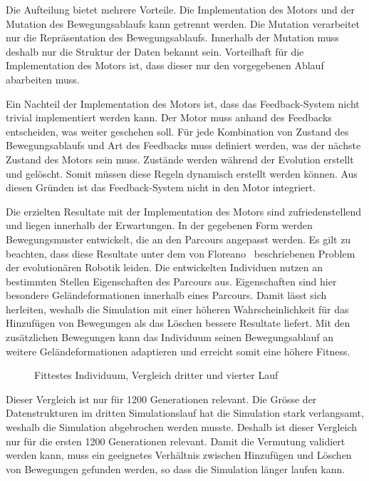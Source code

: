       \smallskip

      Die Aufteilung bietet mehrere Vorteile.
      Die Implementation des Motors und der Mutation des Bewegungsablaufs kann getrennt werden.
      Die Mutation verarbeitet nur die Repräsentation des Bewegungsablaufs.
      Innerhalb der Mutation muss deshalb nur die Struktur der Daten bekannt sein.
      Vorteilhaft für die Implementation des Motors ist, dass dieser nur den vorgegebenen Ablauf abarbeiten muss.

      \smallskip

      Ein Nachteil der Implementation des Motors ist, dass das Feedback-System nicht trivial implementiert werden kann.
      Der Motor muss anhand des Feedbacks entscheiden, was weiter geschehen soll.
      Für jede Kombination von Zustand des Bewegungsablaufs und Art des Feedbacks muss definiert werden,
      was der nächste Zustand des Motors sein muss.
      Zustände werden während der Evolution erstellt und gelöscht.
      Somit müssen diese Regeln dynamisch erstellt werden können.
      Aus diesen Gründen ist das Feedback-System nicht in den Motor integriert.

      \smallskip

      Die erzielten Resultate mit der Implementation des Motors sind zufriedenstellend und
      liegen innerhalb der Erwartungen.
      In der gegebenen Form werden Bewegungsmuster entwickelt, die an den Parcours angepasst werden.
      Es gilt zu beachten, dass diese Resultate unter dem von Floreano~\cite{Floreano2010} beschriebenen Problem
      der evolutionären Robotik leiden.
      Die entwickelten Individuen nutzen an bestimmten Stellen Eigenschaften des Parcours aus.
      Eigenschaften sind hier besondere Geländeformationen innerhalb eines Parcours.
      Damit lässt sich herleiten, weshalb die Simulation mit einer höheren Wahrscheinlichkeit
      für das Hinzufügen von Bewegungen als das Löschen bessere Resultate liefert.
      Mit den zusätzlichen Bewegungen kann das Individuum seinen Bewegungsablauf
      an weitere Geländeformationen adaptieren und erreicht somit eine höhere Fitness.

      \begin{figure}[H]
        \centering
        
        \caption{Fittestes Individuum, Vergleich dritter und vierter Lauf}
      \end{figure}

      Dieser Vergleich ist nur für 1200 Generationen relevant.
      Die Grösse der Datenstrukturen im dritten Simulationslauf hat die Simulation stark verlangsamt,
      weshalb die Simulation abgebrochen werden musste.
      Deshalb ist dieser Vergleich nur für die ersten 1200 Generationen relevant.
      Damit die Vermutung validiert werden kann,
      muss ein geeignetes Verhältnis zwischen Hinzufügen und Löschen von Bewegungen gefunden werden,
      so dass die Simulation länger laufen kann.

